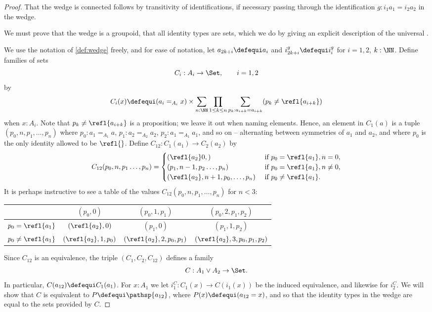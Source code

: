 \begin{proof}
  That the wedge is connected follows by transitivity of identifications,
  if necessary passing through the identification $g:i_1a_1=i_2a_2$ in the wedge.

We must prove that the wedge is a groupoid, \ie that all identity types are sets, which we do by giving an explicit description of the universal \covering.

 We use the notation of \cref{def:wedge} freely, and for ease of notation, let $a_{2k+i}\defequi a_i$ and $i_{2k+i}^g\defequi i_i^g$ for $i=1,2$, $k:\NN$.
Define families of sets
$$C_i:A_i\to\Set,\qquad i=1,2$$
by
$$
C_i(x)\defequi(a_i=_{A_i}x)\times
\sum_{n:\NN}\prod_{1\leq k\leq n}\sum_{p_k:a_{i+k}= a_{i+k}}(p_k\neq\refl {a_{i+k}})
$$
when $x:A_i$.  Note that $p_k\neq\refl{a_{i+k}}$  is a proposition; we leave it out when naming elements. Hence, an element in $C_1(a)$ is a tuple
$(p_0,n,p_1,\dots,p_n)$ where $p_0:a_1=_{A_1}a$, $p_1:a_2=_{A_2}a_2$, $p_2:a_1=_{A_1}a_1$, and so on -- alternating between symmetries of $a_1$ and $a_2$, and where $p_0$ is the only identity allowed to be $\refl{}$. Define $C_{12}:C_1(a_1)\to C_2(a_2)$ by
$$C_{12}(p_0,n,p_1\dots,p_n)=
\begin{cases}
  (\refl{a_2}0,)&\text{ if }p_0=\refl{a_1}, n=0,\\
  (p_1,n-1,p_2\dots,p_n)& \text{ if }p_0=\refl{a_1},n\neq0,\\
  (\refl{a_2},n+1,p_0,\dots,p_n)& \text{ if }p_0\neq\refl{a_1}.
\end{cases}
$$
It is perhaps instructive to see a table of the values $C_{12}(p_0,n,p_1,\dots,p_n)$ for $n<3$:
\begin{center}
  \begin{tabular}{r|c cc}
    &$(p_0,0)$&$(p_0,1,p_1)$&$(p_0,2,p_1,p_2)$\\
    \hline
    $p_0=\refl{a_1}$&$(\refl{a_2},0)$&$(p_1,0)$&$(p_1,1,p_2)$\\
    $p_0\neq\refl{a_1}$&$(\refl{a_2},1,p_0)$&$(\refl{a_2},2,p_0,p_1)$&$(\refl{a_2},3,p_0,p_1,p_2)$
  \end{tabular}
\end{center}
Since $C_{12}$ is an equivalence, the triple $(C_1,C_2,C_{12})$ defines a family
$$C:A_1\vee A_2\to\Set.$$
In particular, $C(a_{12})\defequi C_1(a_1)$.
For $x:A_1$ we let $i^C_1:C_1(x)\to C(i_1(x))$ be the induced equivalence, and likewise for $i^C_2$.
We will show that $C$ is equivalent to $P\defequi \pathsp{a_{12}}$, where $P(x)\defequi(a_{12}=x)$, and so that the identity types in the wedge are equal to the sets provided by $C$.


\end{proof}
